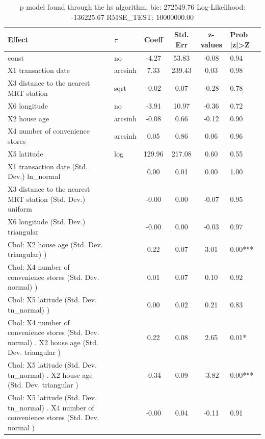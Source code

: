 \begin{table}
	\caption{p model found through the hs algorithm. bic: 272549.76 Log-Likelihood: -136225.67 RMSE_TEST: 10000000.00}
	\begin{center}
		\begin{tabular}{|l|l|c|c|c|l|}
			\hline
			Effect & $\tau$ & Coeff & Std. Err & z-values & Prob |z|>Z \\
			\hline
			const & no & -4.27 & 53.83 & -0.08 & 0.94 \\
			\hline
			X1 transaction date & arcsinh & 7.33 & 239.43 & 0.03 & 0.98 \\
			\hline
			X3 distance to the nearest MRT station & sqrt & -0.02 & 0.07 & -0.28 & 0.78 \\
			\hline
			X6 longitude & no & -3.91 & 10.97 & -0.36 & 0.72 \\
			\hline
			X2 house age & arcsinh & -0.08 & 0.66 & -0.12 & 0.90 \\
			\hline
			X4 number of convenience stores & arcsinh & 0.05 & 0.86 & 0.06 & 0.96 \\
			\hline
			X5 latitude & log & 129.96 & 217.08 & 0.60 & 0.55 \\
			\hline
			X1 transaction date (Std. Dev.) ln_normal &  & 0.00 & 0.01 & 0.00 & 1.00 \\
			\hline
			X3 distance to the nearest MRT station (Std. Dev.) uniform &  & -0.00 & 0.00 & -0.07 & 0.95 \\
			\hline
			X6 longitude (Std. Dev.) triangular &  & -0.00 & 0.00 & -0.03 & 0.97 \\
			\hline
			 Chol: X2 house age (Std. Dev. triangular) ) &  & 0.22 & 0.07 & 3.01 & 0.00*** \\
			\hline
			 Chol: X4 number of convenience stores (Std. Dev. normal) ) &  & 0.01 & 0.07 & 0.10 & 0.92 \\
			\hline
			 Chol: X5 latitude (Std. Dev. tn_normal) ) &  & 0.00 & 0.02 & 0.21 & 0.83 \\
			\hline
			 Chol: X4 number of convenience stores (Std. Dev. normal) . X2 house age (Std. Dev.   triangular ) &  & 0.22 & 0.08 & 2.65 & 0.01* \\
			\hline
			 Chol: X5 latitude (Std. Dev. tn_normal) . X2 house age (Std. Dev.   triangular ) &  & -0.34 & 0.09 & -3.82 & 0.00*** \\
			\hline
			 Chol: X5 latitude (Std. Dev. tn_normal) . X4 number of convenience stores (Std. Dev.   normal ) &  & -0.00 & 0.04 & -0.11 & 0.91 \\
			\hline
		\end{tabular}
	\end{center}
\end{table}